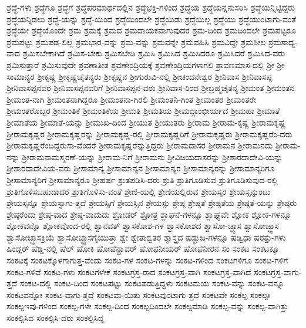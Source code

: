 {ಶ್ರದ್ಧೆ-ಗಳು
ಶ್ರದ್ಧೆಗೂ
ಶ್ರದ್ಧೆಗೆ
ಶ್ರದ್ಧೆಪರಮಾರ್ಥದಲ್ಲಿನ
ಶ್ರದ್ಧೆಭಕ್ತಿ-ಗಳಿಂದ
ಶ್ರದ್ಧೆಯ
ಶ್ರದ್ಧೆಯನ್ನನುಸರಿಸಿ
ಶ್ರದ್ಧೆಯನ್ನಿಟ್ಟಿದ್ದರು
ಶ್ರದ್ಧೆಯನ್ನಿಡಲು
ಶ್ರದ್ಧೆ-ಯನ್ನು
ಶ್ರದ್ಧೆ-ಯಿಂದ
ಶ್ರದ್ಧೆಯಿಂದಲೇ
ಶ್ರದ್ಧೆಯಿಡು
ಶ್ರದ್ಧೆಯಿಲ್ಲ
ಶ್ರದ್ಧೆಯು
ಶ್ರದ್ಧೆಯುಂಟಾಗು-ವಂತೆ
ಶ್ರದ್ಧೆಯೇ
ಶ್ರದ್ಧೆಯೊಂದೇ
ಶ್ರಮ
ಶ್ರಮಕ್ಕೆ
ಶ್ರಮದ
ಶ್ರಮದಾಯಕವಾಗುವುದರ
ಶ್ರಮ-ದಿಂದ
ಶ್ರಮದಿಂದಲೇ
ಶ್ರಮಪಟ್ಟರೂ
ಶ್ರಮಪಟ್ಟು
ಶ್ರಮಪಡ-ಲಿಲ್ಲ
ಶ್ರಮಭಾರ-ವನ್ನು
ಶ್ರಮ-ವನ್ನು
ಶ್ರಮವನ್ನೇ
ಶ್ರಮವಹಿಸಿ
ಶ್ರಮವಿದ್ದೇ
ಶ್ರಮಶೀಲ
ಶ್ರಮಸಾಧ್ಯ-ವಾದ
ಶ್ರಮಿಸಬೇಕಾಗಿದೆ
ಶ್ರಮಿಸ-ಬೇಕು
ಶ್ರಮಿಸಬೇಡಿ
ಶ್ರಮಿಸಿ
ಶ್ರಮಿಸಿದ
ಶ್ರಮಿಸಿದರೂ
ಶ್ರಮಿಸಿದರೆ
ಶ್ರಮಿಸಿದ-ವರು
ಶ್ರಮಿಸುತ್ತಾರೆ
ಶ್ರಮಿಸುವುದೇ
ಶ್ರವಣಾತೀತ
ಶ್ರವಣೇಂದ್ರಿಯಕ್ಕೆ
ಶ್ರವಣೇಂದ್ರಿಯಗಳಾಗಲಿ
ಶ್ರಾವಣಮಾಸ-ದಲ್ಲಿ
ಶ್ರೀ
ಶ್ರೀ-ಸಾಮಾನ್ಯರ
ಶ್ರೀಕೃಷ್ಣ
ಶ್ರೀಕೃಷ್ಣಚೈತನ್ಯರು
ಶ್ರೀಕೃಷ್ಣನ
ಶ್ರೀಗುರುವಿ-ನಲ್ಲಿ
ಶ್ರೀಚಂದನೇಶ್ವರ
ಶ್ರೀನಿವಾಸ
ಶ್ರೀನಿವಾಸಪ್ಪ
ಶ್ರೀನಿವಾಸಪ್ಪನವರ
ಶ್ರೀನಿವಾಸಪ್ಪನವರಿಗೆ
ಶ್ರೀನಿವಾಸಪ್ಪನ-ವರು
ಶ್ರೀನಿವಾಸ-ರಿಂದ
ಶ್ರೀಬ್ರಹ್ಮಚೈತನ್ಯ
ಶ್ರೀಮಂತ
ಶ್ರೀಮಂತನ
ಶ್ರೀಮಂತ-ನಾಗಿ
ಶ್ರೀಮಂತನಾಗಿದ್ದರೂ
ಶ್ರೀಮಂತನಾ-ಗಿರಲಿ
ಶ್ರೀಮಂತನಿ-ಗಿಂತ
ಶ್ರೀಮಂತರ
ಶ್ರೀಮಂತರೇ
ಶ್ರೀಮಂತರೊಬ್ಬರ
ಶ್ರೀಮಂತಿಕೆ
ಶ್ರೀಮಂತಿಕೆಯ
ಶ್ರೀಮತಿ
ಶ್ರೀಮತಿಯ
ಶ್ರೀಮದ್ಗಾಂಭೀರ್ಯದ
ಶ್ರೀಮಹಾ
ಶ್ರೀಮಾತೆ
ಶ್ರೀಮಾತೆಯ
ಶ್ರೀಮಾತೆ-ಯನ್ನು
ಶ್ರೀಮುಖ-ದಿಂದ
ಶ್ರೀಯುತ
ಶ್ರೀಯುತರು
ಶ್ರೀರಾಮ
ಶ್ರೀರಾಮ-ಕೃಷ್ಣ
ಶ್ರೀರಾಮಕೃಷ್ಣ
ಶ್ರೀರಾಮಕೃಷ್ಣರ
ಶ್ರೀರಾಮಕೃಷ್ಣರನ್ನು
ಶ್ರೀರಾಮಕೃಷ್ಣ-ರಲ್ಲಿ
ಶ್ರೀರಾಮಕೃಷ್ಣರಿಗೆ
ಶ್ರೀರಾಮಕೃಷ್ಣರು
ಶ್ರೀರಾಮಕೃಷ್ಣರೆಂ-ದರು
ಶ್ರೀರಾಮಕೃಷ್ಣರೆಂದಿದ್ದರುಸಾ-ವೆಂದರೆ
ಶ್ರೀರಾಮಕೃಷ್ಣರೆನ್ನುತ್ತಿದ್ದರು
ಶ್ರೀರಾಮದಾಸರ
ಶ್ರೀರಾಮನ
ಶ್ರೀರಾಮನದು
ಶ್ರೀರಾಮ-ನನ್ನು
ಶ್ರೀರಾಮನಾಮಸ್ಮರಣೆ-ಯನ್ನು
ಶ್ರೀರಾಮ-ನಿಗೆ
ಶ್ರೀರಾಮನು
ಶ್ರೀವಿಜಯದಾಸರನ್ನು
ಶ್ರೀಶಾರದಾದೇವಿ-ಯನ್ನು
ಶ್ರೀಶಾರದಾದೇವಿಯ-ವರು
ಶ್ರೀಸಾಮಾನ್ಯ
ಶ್ರೀಸಾಮಾನ್ಯನ
ಶ್ರೀಸಾಮಾನ್ಯರ
ಶ್ರೀಸಾಮಾನ್ಯರನ್ನು
ಶ್ರೀಸಾಮಾನ್ಯರಿಗೂ
ಶ್ರೀಸಾಮಾನ್ಯರಿಗೆ
ಶ್ರೀಸಾಮಾನ್ಯರೂ
ಶ್ರೀಹರ್ಷ
ಶ್ರುತಪಡಿಸಿ-ದರು
ಶ್ರುತಿ
ಶ್ರುತಿಗೂಡಿಸುವ
ಶ್ರುತಿಗೂಡಿಸುವುದ-ರಲ್ಲಿ
ಶ್ರುತಿಗೊಳಿಸಬಹುದಾದರೆ
ಶ್ರುತಿಗೊಳಿಸು-ವಂತೆ
ಶ್ರೇಣಿ-ಯಲ್ಲಿ
ಶ್ರೇಣಿಯಲ್ಲಿರುವ
ಶ್ರೇಯಸ್ಕರ
ಶ್ರೇಯಸ್ಸನ್ನುಂಟು
ಶ್ರೇಯಸ್ಸನ್ನೂ
ಶ್ರೇಯಸ್ಸಾಗು-ತ್ತದೆ
ಶ್ರೇಯಸ್ಸಿಗೆ
ಶ್ರೇಯಸ್ಸಿನ
ಶ್ರೇಯಸ್ಸು
ಶ್ರೇಷ್ಠ
ಶ್ರೇಷ್ಠತೆ
ಶ್ರೇಷ್ಠತೆಯ
ಶ್ರೇಷ್ಠತೆ-ಯನ್ನು
ಶ್ರೇಷ್ಠರು
ಶ್ರೇಷ್ಠರೆಂದು
ಶ್ರೇಷ್ಠ-ವಾದ
ಶ್ರೇಷ್ಠ-ವಾದುದು
ಶ್ರೋಡರ್
ಶ್ರೋತ್ರ
ಶ್ಲಾಘನೆ-ಗಳನ್ನೂ
ಶ್ಲಾಘ್ಯವೇ
ಶ್ಲೋಕ
ಶ್ಲೋಕ-ಗಳನ್ನೂ
ಶ್ಲೋಕವನ್ನೊ
ಶ್ಲೋಕವೊಂದ-ರಲ್ಲಿ
ಶ್ವಾನವತ್
ಶ್ವಾಸಕೋಶ-ಗಳ
ಶ್ವಾಸಕೋಶದ
ಶ್ವಾಸೋ-ಚ್ಛ್ವಾಸ
ಶ್ವಾಸೋಚ್ಛ್ವಾಸ
ಶ್ವಾಸೋಚ್ಛ್ವಾಸಕ್ರಿಯೆ
ಶ್ವಾಸೋಚ್ಛ್ವಾಸಗೈಯುತ್ತಾ
ಶ್ವೇ
ಶ್ವೇತಾಶ್ವತರ
ಶ್ಶಾಸ್ತ್ರದ
ಷಡ್ಭುಜ-ಗಳನ್ನೂ
ಷಡ್ವಿಧಾ
ಷರತ್ತು-ಗಳು
ಷಿಂಡ್ಲರ್
ಷೆಡ್ಡಿ-ನಲ್ಲಿ
ಷೆಲ್
ಷೋಕಿ
ಷೋಪೆನ್ಹಾವರ್
ಷೋಫನೀಯರ್
ಷೋಫೆನೀರನ
ಸಂ
ಸಂಕಟ
ಸಂಕಟಕ್ಕೂ
ಸಂಕಟಕ್ಕೆ
ಸಂಕಟಕ್ಕೊಳಗಾಗುತ್ತ-ವೆಂದು
ಸಂಕಟ-ಗಳ
ಸಂಕಟ-ಗಳನ್ನು
ಸಂಕಟ-ಗಳಿಂದ
ಸಂಕಟಗಳಿಗೂ
ಸಂಕಟ-ಗಳಿಗೆ
ಸಂಕಟ-ಗಳಿವೆ
ಸಂಕಟ-ಗಳು
ಸಂಕಟಗಳೇಕೆ
ಸಂಕಟಗ್ರಸ್ತ-ರಾದ
ಸಂಕಟಗ್ರಸ್ತ-ವಾಗಿ
ಸಂಕಟಗ್ರಸ್ತ-ವಾಗಿದೆ
ಸಂಕಟಗ್ರಸ್ತ-ವಾಗು-ತ್ತದೆ
ಸಂಕಟ-ದಲ್ಲಿ
ಸಂಕಟ-ದಿಂದ
ಸಂಕಟಪಟ್ಟು
ಸಂಕಟಪಡುತ್ತಿದ್ದಳು
ಸಂಕಟಮಯ
ಸಂಕಟ-ವನ್ನು
ಸಂಕಟ-ವನ್ನೂ
ಸಂಕಟವನ್ನೋ
ಸಂಕಟ-ವಾಗು-ತ್ತದೆ
ಸಂಕಟವಾ-ಯಿತು
ಸಂಕಟವುಂಟಾಗು-ತ್ತದೆ
ಸಂಕಟವೇ
ಸಂಕಲ್ಪ
ಸಂಕಲ್ಪಃ
ಸಂಕಲ್ಪಇವು-ಗಳಿಂದ
ಸಂಕಲ್ಪ-ಗಳೇ
ಸಂಕಲ್ಪ-ದಿಂದ
ಸಂಕಲ್ಪದಿಂದಲೇ
ಸಂಕಲ್ಪಮಾಡಿ
ಸಂಕಲ್ಪ-ವನ್ನು
ಸಂಕಲ್ಪ-ವಾಗಿತ್ತು
ಸಂಕಲ್ಪಿಸಿದ
ಸಂಕಲ್ಪಿಸಿ-ದರು
ಸಂಕಲ್ಪಿಸಿದ್ದ
}
